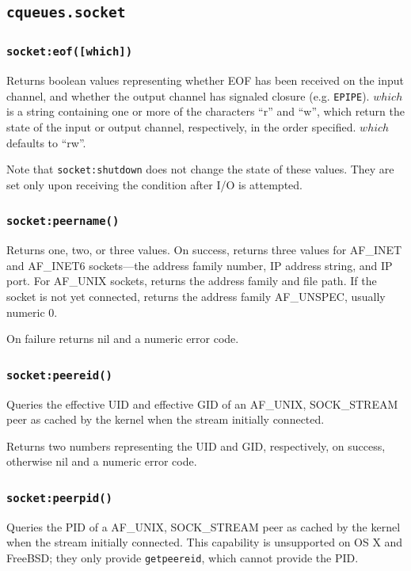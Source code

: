 \documentclass[11pt, oneside]{memoir}
\newcommand*{\fn}[1]{\texttt{#1}\xspace}
\newcommand*{\errno}[1]{\texttt{#1}\xspace}
\newcounter{toccols}
\newenvironment{Module}[1]{
	\subsection{\texttt{#1}}
	\addtocontents{toc}{
		\protect\begin{multicols}{\value{toccols}}
	}
}{
	\addtocontents{toc}{\protect\end{multicols}}
}
\begin{document}
\begin{Module}{cqueues.socket}
\subsubsection[\fn{socket:eof}]{\fn{socket:eof([which])}}
Returns boolean values representing whether EOF has been received on the input channel, and whether the output channel has signaled closure (e.g. \errno{EPIPE}). $which$ is a string containing one or more of the characters ``r'' and ``w'', which return the state of the input or output channel, respectively, in the order specified. $which$ defaults to ``rw''.

Note that \fn{socket:shutdown} does not change the state of these values. They are set only upon receiving the condition after I/O is attempted.

\subsubsection[\fn{socket:peername}]{\fn{socket:peername()}}
Returns one, two, or three values. On success, returns three values for AF\_INET and AF\_INET6 sockets---the address family number, IP address string, and IP port. For AF\_UNIX sockets, returns the address family and file path. If the socket is not yet connected, returns the address family AF\_UNSPEC, usually numeric 0.

On failure returns nil and a numeric error code.

\subsubsection[\fn{socket:peereid}]{\fn{socket:peereid()}}

Queries the effective UID and effective GID of an AF\_UNIX, SOCK\_STREAM peer as cached by the kernel when the stream initially connected.

Returns two numbers representing the UID and GID, respectively, on success, otherwise nil and a numeric error code.

\subsubsection[\fn{socket:peerpid}]{\fn{socket:peerpid()}}

Queries the PID of a AF\_UNIX, SOCK\_STREAM peer as cached by the kernel when the stream initially connected. This capability is unsupported on OS X and FreeBSD; they only provide \fn{getpeereid}, which cannot provide the PID.


\end{Module}
\end{document}
